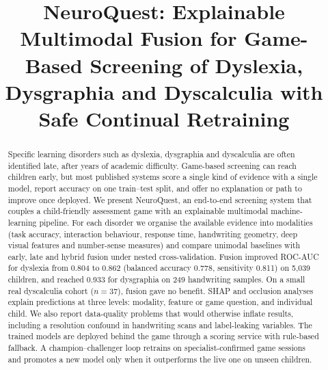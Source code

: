 \documentclass[conference]{IEEEtran}
\begin{document}
\title{NeuroQuest: Explainable Multimodal Fusion for Game-Based Screening of Dyslexia, Dysgraphia and Dyscalculia with Safe Continual Retraining}

\author{
\and
{}
}

\maketitle

\begin{abstract}
Specific learning disorders such as dyslexia, dysgraphia and dyscalculia are often identified late, after years of
academic difficulty. Game-based screening can reach children early, but most published systems score a single kind of
evidence with a single model, report accuracy on one train--test split, and offer no explanation or path to improve once
deployed. We present NeuroQuest, an end-to-end screening system that couples a child-friendly assessment game with an
explainable multimodal machine-learning pipeline. For each disorder we organise the available evidence into
modalities (task accuracy, interaction behaviour, response time, handwriting geometry, deep visual features and
number-sense measures) and compare unimodal baselines with early, late and hybrid fusion under nested
cross-validation. Fusion improved ROC-AUC for dyslexia from 0.804 to 0.862 (balanced accuracy 0.778, sensitivity
0.811) on 5,039 children, and reached 0.933 for dysgraphia on 249 handwriting samples. On a small real dyscalculia
cohort ($n=37$), fusion gave no benefit. SHAP and occlusion analyses explain predictions at three levels: modality,
feature or game question, and individual child. We also report data-quality problems that would otherwise inflate
results, including a resolution confound in handwriting scans and label-leaking variables. The trained models are
deployed behind the game through a scoring service with rule-based fallback. A champion--challenger loop retrains on
specialist-confirmed game sessions and promotes a new model only when it outperforms the live one on unseen children.
\end{abstract}
\end{document}
